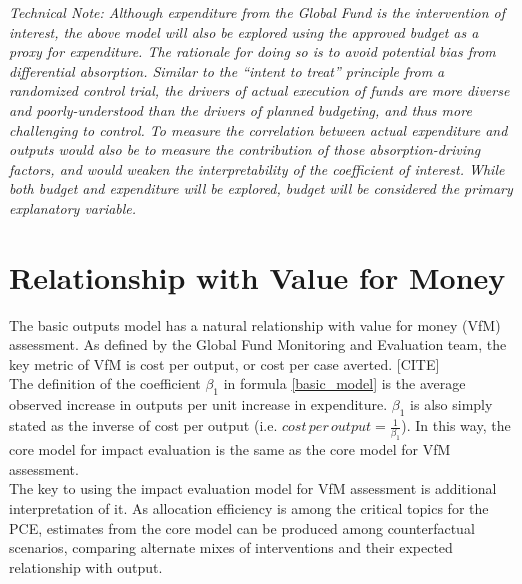 \documentclass[twocolumn]{bmcart}%
\begin{document}
\textit{Technical Note: Although expenditure from the Global Fund is the intervention of interest, the above model will also be explored using the approved budget as a proxy for expenditure. The rationale for doing so is to avoid potential bias from differential absorption. Similar to the ``intent to treat'' principle from a randomized control trial, the drivers of actual execution of funds are more diverse and poorly-understood than the drivers of planned budgeting, and thus more challenging to control. To measure the correlation between actual expenditure and outputs would also be to measure the contribution of those absorption-driving factors, and would weaken the interpretability of the coefficient of interest. While both budget and expenditure will be explored, budget will be considered the primary explanatory variable.}


\section{Relationship with Value for Money} \label{vfm}
The basic outputs model has a natural relationship with value for money (VfM) assessment. As defined by the Global Fund Monitoring and Evaluation team, the key metric of VfM is cost per output, or cost per case averted. [CITE] \\

The definition of the coefficient $\beta_1$ in formula \ref{basic_model} is the average observed increase in outputs per unit increase in expenditure. $\beta_1$ is also simply stated as the inverse of cost per output (i.e. $cost\, per\, output = \frac{1}{\beta_1}$). In this way, the core model for impact evaluation is the same as the core model for VfM assessment. \\

The key to using the impact evaluation model for VfM assessment is additional interpretation of it. As allocation efficiency is among the critical topics for the PCE, estimates from the core model can be produced among counterfactual scenarios, comparing alternate mixes of interventions and their expected relationship with output.



\end{document}

